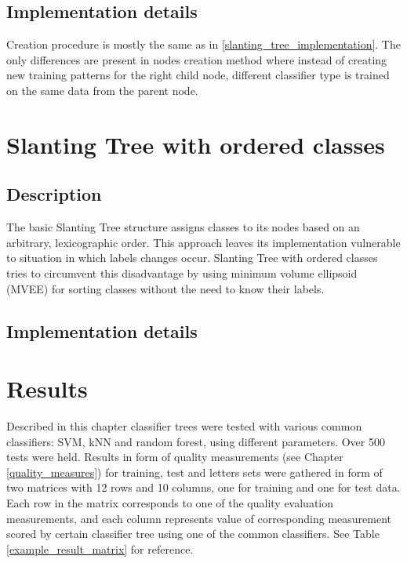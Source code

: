 \subsection{Implementation details}

Creation procedure is mostly the same as in \ref{slanting_tree_implementation}. The only differences are present in nodes creation method where instead of creating new training patterns for the right child node, different classifier type is trained on the same data from the parent node.

\section{Slanting Tree with ordered classes}

\subsection{Description}

The basic Slanting Tree structure assigns classes to its nodes based on an arbitrary, lexicographic order. This approach leaves its implementation vulnerable to situation in which labels changes occur. Slanting Tree with ordered classes tries to circumvent this disadvantage by using minimum volume ellipsoid (MVEE) for sorting classes without the need to know their labels.

\subsection{Implementation details}



\section{Results}

Described in this chapter classifier trees were tested with various common classifiers: SVM, kNN and random forest, using different parameters. Over 500 tests were held. Results in form of quality measurements (see Chapter \ref{quality_measures}) for training, test and letters sets were gathered in form of two matrices with 12 rows and 10 columns, one for training and one for test data. Each row in the matrix corresponds to one of the quality evaluation measurements, and each column represents value of corresponding measurement scored by certain classifier tree using one of the common classifiers. See Table \ref{example_result_matrix} for reference.

